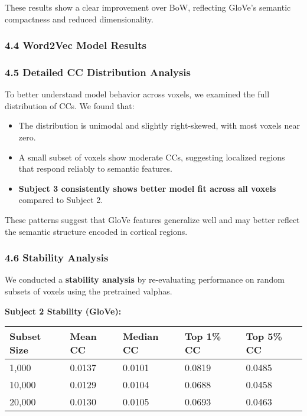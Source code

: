 \documentclass[11pt]{article}
\begin{document}
These results show a clear improvement over BoW, reflecting GloVe's
semantic compactness and reduced dimensionality.

\hypertarget{word2vec-model-results}{%
\subsubsection{4.4 Word2Vec Model
Results}\label{word2vec-model-results}}

\hypertarget{detailed-cc-distribution-analysis}{%
\subsubsection{4.5 Detailed CC Distribution
Analysis}\label{detailed-cc-distribution-analysis}}

To better understand model behavior across voxels, we examined the full
distribution of CCs. We found that:

\begin{itemize}
\item
  The distribution is unimodal and slightly right-skewed, with most
  voxels near zero.
\item
  A small subset of voxels show moderate CCs, suggesting localized
  regions that respond reliably to semantic features.
\item
  \textbf{Subject 3 consistently shows better model fit across all
  voxels} compared to Subject 2.
\end{itemize}

These patterns suggest that GloVe features generalize well and may
better reflect the semantic structure encoded in cortical regions.

\hypertarget{stability-analysis}{%
\subsubsection{4.6 Stability Analysis}\label{stability-analysis}}

We conducted a \textbf{stability analysis} by re-evaluating performance
on random subsets of voxels using the pretrained valphas.

\textbf{Subject 2 Stability (GloVe):}

\begin{longtable}[]{@{}lllll@{}}
\toprule
Subset Size & Mean CC & Median CC & Top 1\% CC & Top 5\% CC \\
\midrule
\endhead
1,000 & 0.0137 & 0.0101 & 0.0819 & 0.0485 \\
10,000 & 0.0129 & 0.0104 & 0.0688 & 0.0458 \\
20,000 & 0.0130 & 0.0105 & 0.0693 & 0.0463 \\
\bottomrule
\end{longtable}
\end{document}
